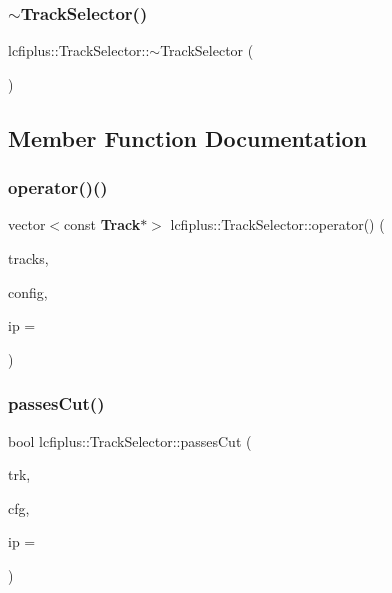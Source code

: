 \subsubsection{$\sim$\+Track\+Selector()}
{\footnotesize\ttfamily lcfiplus\+::\+Track\+Selector\+::$\sim$\+Track\+Selector (\begin{DoxyParamCaption}{ }\end{DoxyParamCaption})\hspace{0.3cm}{\ttfamily [inline]}}



\subsection{Member Function Documentation}
\mbox{\label{classlcfiplus_1_1TrackSelector_ae8200559c5e0e58dbacdea3531275e13}} 
\subsubsection{operator()()}
{\footnotesize\ttfamily vector$<$const \textbf{ Track}$\ast$$>$ lcfiplus\+::\+Track\+Selector\+::operator() (\begin{DoxyParamCaption}\item[{const vector$<$ const \textbf{ Track} $\ast$$>$ \&}]{tracks,  }\item[{\textbf{ Track\+Selector\+Config} \&}]{config,  }\item[{const \textbf{ Vertex} $\ast$}]{ip = {} }\end{DoxyParamCaption})\hspace{0.3cm}{\ttfamily [inline]}}

\mbox{\label{classlcfiplus_1_1TrackSelector_a930302ce2032a72546317dd5fa0b01cf}} 
\subsubsection{passes\+Cut()}
{\footnotesize\ttfamily bool lcfiplus\+::\+Track\+Selector\+::passes\+Cut (\begin{DoxyParamCaption}\item[{const \textbf{ Track} $\ast$}]{trk,  }\item[{const \textbf{ Track\+Selector\+Config} \&}]{cfg,  }\item[{const \textbf{ Vertex} $\ast$}]{ip = {} }\end{DoxyParamCaption})\hspace{0.3cm}{\ttfamily [inline]}}



